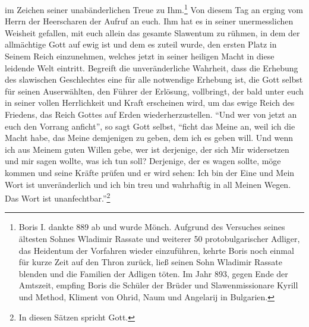 im Zeichen seiner unabänderlichen Treue zu Ihm.\footnote{Boris I. dankte 889 ab und wurde Mönch. Aufgrund des Versuches seines ältesten Sohnes Wladimir Rassate und weiterer 50 protobulgarischer Adliger, das Heidentum der Vorfahren wieder einzuführen, kehrte Boris noch einmal für kurze Zeit auf den Thron zurück, ließ seinen Sohn Wladimir Rassate blenden und die Familien der Adligen töten. Im Jahr 893, gegen Ende der Amtszeit, empfing Boris die Schüler der Brüder und Slawenmissionare Kyrill und Method, Kliment von Ohrid, Naum und Angelarij in Bulgarien.} Von diesem Tag an erging vom Herrn der Heerscharen der Aufruf an euch. Ihm hat es in seiner unermesslichen Weisheit gefallen, mit euch allein das gesamte Slawentum zu rühmen, in dem der allmächtige Gott auf ewig ist und dem es zuteil wurde, den ersten Platz in Seinem Reich einzunehmen, welches jetzt in seiner heiligen Macht in diese leidende Welt eintritt. Begreift die unveränderliche Wahrheit, dass die Erhebung des slawischen Geschlechtes eine für alle notwendige Erhebung ist, die Gott selbst für seinen Auserwählten, den Führer der Erlösung, vollbringt, der bald unter euch in seiner vollen Herrlichkeit und Kraft erscheinen wird, um das ewige Reich des Friedens, das Reich Gottes auf Erden wiederherzustellen. "`Und wer von jetzt an euch den Vorrang anficht"', so sagt Gott selbst, "`ficht das Meine an, weil ich die Macht habe, das Meine demjenigen zu geben, dem ich es geben will. Und wenn ich aus Meinem guten Willen gebe, wer ist derjenige, der sich Mir widersetzen und mir sagen wollte, was ich tun soll? Derjenige, der es wagen sollte, möge kommen und seine Kräfte prüfen und er wird sehen: Ich bin der Eine und Mein Wort ist unveränderlich und ich bin treu und wahrhaftig in all Meinen Wegen. Das Wort ist unanfechtbar."'\footnote{ In diesen Sätzen spricht Gott.} 

